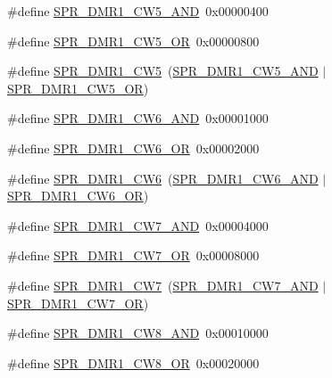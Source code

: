 \begin{DoxyCompactItemize}
\item 
\#define \hyperlink{spr-defs_8h_a2d67a823cdbba8c755c508ce0e5bc5df}{\-S\-P\-R\-\_\-\-D\-M\-R1\-\_\-\-C\-W5\-\_\-\-A\-N\-D}~0x00000400
\item 
\#define \hyperlink{spr-defs_8h_a16980de892759b8f6d41f4b66fd8fc3d}{\-S\-P\-R\-\_\-\-D\-M\-R1\-\_\-\-C\-W5\-\_\-\-O\-R}~0x00000800
\item 
\#define \hyperlink{spr-defs_8h_a781d9d1db8104e45838713691a6ffbf7}{\-S\-P\-R\-\_\-\-D\-M\-R1\-\_\-\-C\-W5}~(\hyperlink{spr-defs_8h_a2d67a823cdbba8c755c508ce0e5bc5df}{\-S\-P\-R\-\_\-\-D\-M\-R1\-\_\-\-C\-W5\-\_\-\-A\-N\-D} $|$ \hyperlink{spr-defs_8h_a16980de892759b8f6d41f4b66fd8fc3d}{\-S\-P\-R\-\_\-\-D\-M\-R1\-\_\-\-C\-W5\-\_\-\-O\-R})
\item 
\#define \hyperlink{spr-defs_8h_ace7020a2678bebbc2a5f584046928e1c}{\-S\-P\-R\-\_\-\-D\-M\-R1\-\_\-\-C\-W6\-\_\-\-A\-N\-D}~0x00001000
\item 
\#define \hyperlink{spr-defs_8h_a01a9c5a55ab65344fd7a61d9bdd267fc}{\-S\-P\-R\-\_\-\-D\-M\-R1\-\_\-\-C\-W6\-\_\-\-O\-R}~0x00002000
\item 
\#define \hyperlink{spr-defs_8h_a5284bc3bd4e401f3e94266af7e8dcb27}{\-S\-P\-R\-\_\-\-D\-M\-R1\-\_\-\-C\-W6}~(\hyperlink{spr-defs_8h_ace7020a2678bebbc2a5f584046928e1c}{\-S\-P\-R\-\_\-\-D\-M\-R1\-\_\-\-C\-W6\-\_\-\-A\-N\-D} $|$ \hyperlink{spr-defs_8h_a01a9c5a55ab65344fd7a61d9bdd267fc}{\-S\-P\-R\-\_\-\-D\-M\-R1\-\_\-\-C\-W6\-\_\-\-O\-R})
\item 
\#define \hyperlink{spr-defs_8h_a75c3f217077a00c0f692792bd78934e8}{\-S\-P\-R\-\_\-\-D\-M\-R1\-\_\-\-C\-W7\-\_\-\-A\-N\-D}~0x00004000
\item 
\#define \hyperlink{spr-defs_8h_a75cda5840c0e47b9ce58ea14ee4b0987}{\-S\-P\-R\-\_\-\-D\-M\-R1\-\_\-\-C\-W7\-\_\-\-O\-R}~0x00008000
\item 
\#define \hyperlink{spr-defs_8h_a3d09778578e3e62aa347c9f9de5d2bc3}{\-S\-P\-R\-\_\-\-D\-M\-R1\-\_\-\-C\-W7}~(\hyperlink{spr-defs_8h_a75c3f217077a00c0f692792bd78934e8}{\-S\-P\-R\-\_\-\-D\-M\-R1\-\_\-\-C\-W7\-\_\-\-A\-N\-D} $|$ \hyperlink{spr-defs_8h_a75cda5840c0e47b9ce58ea14ee4b0987}{\-S\-P\-R\-\_\-\-D\-M\-R1\-\_\-\-C\-W7\-\_\-\-O\-R})
\item 
\#define \hyperlink{spr-defs_8h_a748c78dea93a1f7ee5fea5a9ef026df2}{\-S\-P\-R\-\_\-\-D\-M\-R1\-\_\-\-C\-W8\-\_\-\-A\-N\-D}~0x00010000
\item 
\#define \hyperlink{spr-defs_8h_a998e0d35bd5a3ed84b80a1b28cb66f3f}{\-S\-P\-R\-\_\-\-D\-M\-R1\-\_\-\-C\-W8\-\_\-\-O\-R}~0x00020000
\item 

\end{DoxyCompactItemize}

